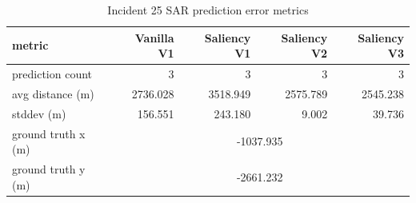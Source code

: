 \begin{table}[ht]
\centering
\caption{Incident 25 SAR prediction error metrics}
\label{tab:sar-incident-25}
\begin{tabular}{lrrrr}
\hline
metric & Vanilla V1 & Saliency V1 & Saliency V2 & Saliency V3 \\
\hline
prediction count & 3 & 3 & 3 & 3 \\
avg distance (m) & 2736.028 & 3518.949 & 2575.789 & 2545.238 \\
stddev (m) & 156.551 & 243.180 & 9.002 & 39.736 \\
ground truth x (m) & \multicolumn{4}{c}{-1037.935} \\
ground truth y (m) & \multicolumn{4}{c}{-2661.232} \\
\hline
\end{tabular}
\end{table}
